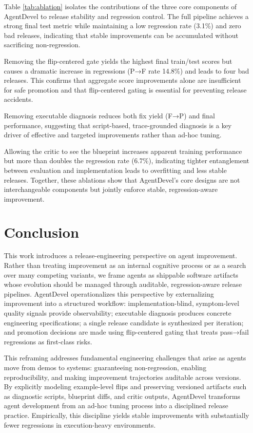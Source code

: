 \documentclass[11pt]{article}
\begin{document}
Table \ref{tab:ablation} isolates the contributions of the three core components of AgentDevel to release stability and regression control. The full pipeline achieves a strong final test metric while maintaining a low regression rate (3.1\%) and zero bad releases, indicating that stable improvements can be accumulated without sacrificing non-regression.

Removing the flip-centered gate yields the highest final train/test scores but causes a dramatic increase in regressions (P→F rate 14.8\%) and leads to four bad releases. This confirms that aggregate score improvements alone are insufficient for safe promotion and that flip-centered gating is essential for preventing release accidents.

Removing executable diagnosis reduces both fix yield (F→P) and final performance, suggesting that script-based, trace-grounded diagnosis is a key driver of effective and targeted improvements rather than ad-hoc tuning.

Allowing the critic to see the blueprint increases apparent training performance but more than doubles the regression rate (6.7\%), indicating tighter entanglement between evaluation and implementation leads to overfitting and less stable releases. Together, these ablations show that AgentDevel’s core designs are not interchangeable components but jointly enforce stable, regression-aware improvement.





\section{Conclusion}
This work introduces a release-engineering perspective on agent improvement. Rather than treating improvement as an internal cognitive process or as a search over many competing variants, we frame agents as shippable software artifacts whose evolution should be managed through auditable, regression-aware release pipelines. AgentDevel operationalizes this perspective by externalizing improvement into a structured workflow: implementation-blind, symptom-level quality signals provide observability; executable diagnosis produces concrete engineering specifications; a single release candidate is synthesized per iteration; and promotion decisions are made using flip-centered gating that treats pass→fail regressions as first-class risks.

This reframing addresses fundamental engineering challenges that arise as agents move from demos to systems: guaranteeing non-regression, enabling reproducibility, and making improvement trajectories auditable across versions. By explicitly modeling example-level flips and preserving versioned artifacts such as diagnostic scripts, blueprint diffs, and critic outputs, AgentDevel transforms agent development from an ad-hoc tuning process into a disciplined release practice. Empirically, this discipline yields stable improvements with substantially fewer regressions in execution-heavy environments.
\end{document}
